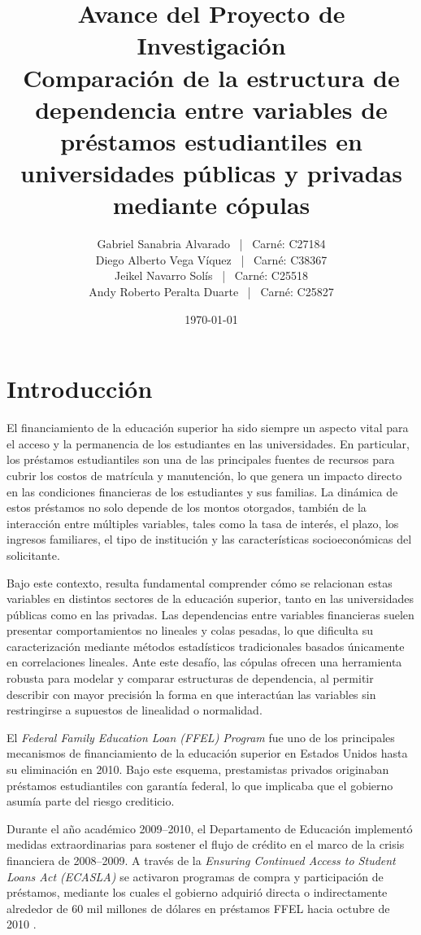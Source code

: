 \documentclass[11pt,a4paper]{article}
\title{Avance del Proyecto de Investigación \\[0.2cm]
\large Comparación de la estructura de dependencia entre variables de préstamos estudiantiles en universidades públicas y privadas mediante cópulas}
\author{
Gabriel Sanabria Alvarado \, | \, Carné: C27184 \\
Diego Alberto Vega Víquez \, | \, Carné: C38367 \\
Jeikel Navarro Solís \, | \, Carné: C25518 \\
Andy Roberto Peralta Duarte \, | \, Carné: C25827
}
\date{\today}
\begin{document}
\maketitle

\section{Introducción}

El financiamiento de la educación superior ha sido siempre un aspecto vital para el acceso y la permanencia de los estudiantes en las universidades. En particular, los préstamos estudiantiles son una de las principales fuentes de recursos para cubrir los costos de matrícula y manutención, lo que genera un impacto directo en las condiciones financieras de los estudiantes y sus familias. La dinámica de estos préstamos no solo depende de los montos otorgados, también de la interacción entre múltiples variables, tales como la tasa de interés, el plazo, los ingresos familiares, el tipo de institución y las características socioeconómicas del solicitante.

Bajo este contexto, resulta fundamental comprender cómo se relacionan estas variables en distintos sectores de la educación superior, tanto en las universidades públicas como en las privadas. Las dependencias entre variables financieras suelen presentar comportamientos no lineales y colas pesadas, lo que dificulta su caracterización mediante métodos estadísticos tradicionales basados únicamente en correlaciones lineales. Ante este desafío, las cópulas ofrecen una herramienta robusta para modelar y comparar estructuras de dependencia, al permitir describir con mayor precisión la forma en que interactúan las variables sin restringirse a supuestos de linealidad o normalidad.

El \textit{Federal Family Education Loan (FFEL) Program} fue uno de los principales mecanismos de financiamiento de la educación superior en Estados Unidos hasta su eliminación en 2010. Bajo este esquema, prestamistas privados originaban préstamos estudiantiles con garantía federal, lo que implicaba que el gobierno asumía parte del riesgo crediticio.

Durante el año académico 2009--2010, el Departamento de Educación implementó medidas extraordinarias para sostener el flujo de crédito en el marco de la crisis financiera de 2008--2009. A través de la \textit{Ensuring Continued Access to Student Loans Act (ECASLA)} se activaron programas de compra y participación de préstamos, mediante los cuales el gobierno adquirió directa o indirectamente alrededor de 60 mil millones de dólares en préstamos FFEL hacia octubre de 2010 \parencite{usdoe2010}.
\end{document}
